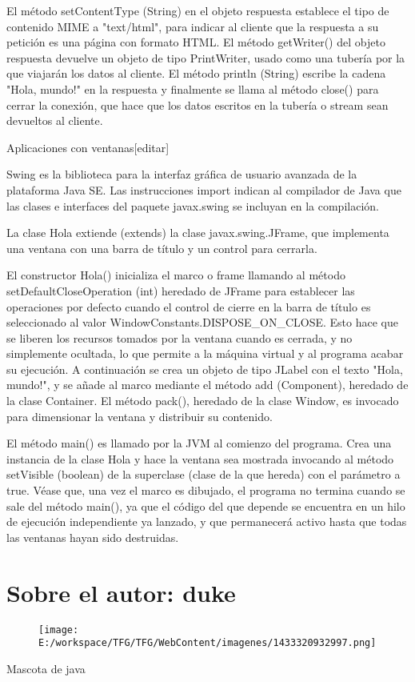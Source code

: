 \documentclass[11pt,a4paper]{$type}
\begin{document}
	\bigskip
							El método setContentType (String) en el objeto respuesta establece el tipo de contenido MIME a "text/html", para indicar al cliente que la respuesta a su petición es una página con formato HTML. El método getWriter() del objeto respuesta devuelve un objeto de tipo PrintWriter, usado como una tubería por la que viajarán los datos al cliente. El método println (String) escribe la cadena "Hola, mundo!" en la respuesta y finalmente se llama al método close() para cerrar la conexión, que hace que los datos escritos en la tubería o stream sean devueltos al cliente.
	\bigskip
							
	\bigskip
							Aplicaciones con ventanas[editar]
	\bigskip
							
	\bigskip
							Swing es la biblioteca para la interfaz gráfica de usuario avanzada de la plataforma Java SE.
	\bigskip
							Las instrucciones import indican al compilador de Java que las clases e interfaces del paquete javax.swing se incluyan en la compilación.
	\bigskip
							
	\bigskip
							La clase Hola extiende (extends) la clase javax.swing.JFrame, que implementa una ventana con una barra de título y un control para cerrarla.
	\bigskip
							
	\bigskip
							El constructor Hola() inicializa el marco o frame llamando al método setDefaultCloseOperation (int) heredado de JFrame para establecer las operaciones por defecto cuando el control de cierre en la barra de título es seleccionado al valor WindowConstants.DISPOSE\_ON\_CLOSE. Esto hace que se liberen los recursos tomados por la ventana cuando es cerrada, y no simplemente ocultada, lo que permite a la máquina virtual y al programa acabar su ejecución. A continuación se crea un objeto de tipo JLabel con el texto "Hola, mundo!", y se añade al marco mediante el método add (Component), heredado de la clase Container. El método pack(), heredado de la clase Window, es invocado para dimensionar la ventana y distribuir su contenido.
	\bigskip
							
	\bigskip
							El método main() es llamado por la JVM al comienzo del programa. Crea una instancia de la clase Hola y hace la ventana sea mostrada invocando al método setVisible (boolean) de la superclase (clase de la que hereda) con el parámetro a true. Véase que, una vez el marco es dibujado, el programa no termina cuando se sale del método main(), ya que el código del que depende se encuentra en un hilo de ejecución independiente ya lanzado, y que permanecerá activo hasta que todas las ventanas hayan sido destruidas.
	\bigskip
			
			\chapter{Sobre el autor: duke}
						\begin{figure}[hbtp]
		\centering
		\texttt{[image: E:/workspace/TFG/TFG/WebContent/imagenes/1433320932997.png]}
	\end{figure}
								Mascota de java
	\bigskip
			
\end{document}
